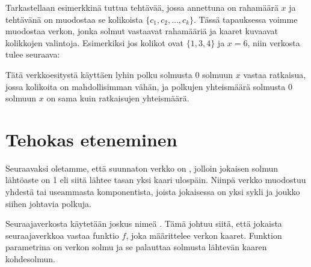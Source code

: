 Tarkastellaan esimerkkinä tuttua tehtävää,
jossa annettuna on rahamäärä $x$
ja tehtävänä on muodostaa se kolikoista
$\{c_1,c_2,\ldots,c_k\}$.
Tässä tapauksessa voimme muodostaa verkon, jonka solmut
vastaavat rahamääriä ja kaaret kuvaavat
kolikkojen valintoja.
Esimerkiksi jos kolikot ovat $\{1,3,4\}$
ja $x=6$, niin verkosta tulee seuraava:
\begin{center}
\end{center}

Tätä verkkoesitystä käyttäen
lyhin polku solmusta 0 solmuun $x$
vastaa ratkaisua, jossa kolikoita on
mahdollisimman vähän, ja polkujen yhteismäärä
solmusta 0 solmuun $x$
on sama kuin ratkaisujen yhteismäärä.

\section{Tehokas eteneminen}


Seuraavaksi oletamme, että
suunnaton verkko on ,
jolloin jokaisen solmun lähtöaste on 1
eli siitä lähtee tasan yksi kaari ulospäin.
Niinpä verkko muodostuu yhdestä tai useammasta
komponentista, joista jokaisessa on yksi sykli
ja joukko siihen johtavia polkuja.

Seuraajaverkosta käytetään joskus nimeä
.
Tämä johtuu siitä, että jokaista seuraajaverkkoa
vastaa funktio $f$, joka määrittelee verkon kaaret.
Funktion parametrina on verkon solmu ja
se palauttaa solmusta lähtevän kaaren kohdesolmun.

